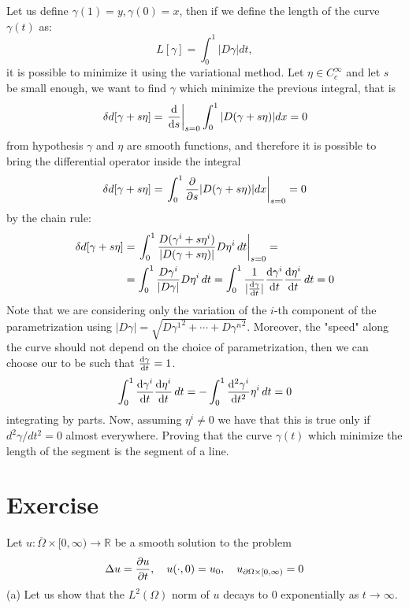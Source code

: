 \documentclass{article}
\newcommand{\R}{\mathbb{R}}
\begin{document}
Let us define $\gamma(1) = y, \gamma(0) = x$, then if we define the length of the curve $\gamma(t)$ as:
\[
    L[\gamma] = \int_0^1 |D \gamma| dt,
\]
it is possible to minimize it using the variational method. Let $\eta \in C_c^\infty$ and let $s$ be small enough, we want to find $\gamma$ which minimize the previous integral, that is 
\[
    \delta d[\gamma + s \eta] = {\left. \odv{}{s}\right|}_{s=0} \int_{0}^{1} |D(\gamma + s \eta)| dx = 0
\]
from hypothesis $\gamma$ and $\eta$ are smooth functions, and therefore it is possible to bring the differential operator inside the integral
\[
    \delta d[\gamma + s \eta] = {\left. \int_{0}^{1}  \pdv{}{s} |D(\gamma + s \eta)| dx \right|}_{s=0} = 0
\]
by the chain rule:
\[
    \begin{split}
        \delta d[\gamma + s \eta] &= {\left. \int_{0}^{1} \frac{D(\gamma^i + s \eta^i)}{|D(\gamma + s \eta)|} D \eta^i \, dt \right|}_{s=0} =\\
        &= \int_{0}^{1} \frac{D\gamma^i}{|D\gamma|} D \eta^i\, dt = \int_{0}^{1} \frac{1}{|\odv{\gamma}{t}|} \odv{\gamma^i}{t} \odv{\eta^i}{t}\, dt = 0
    \end{split}
\]
Note that we are considering only the variation of the $i$-th component of the parametrization using $|D \gamma| = \sqrt{{D\gamma^1}^2 + \cdots + {D\gamma^n}^2}$.  Moreover, the "speed" along the curve should not depend on the choice of parametrization, then we can choose our to be such that $\odv{\gamma}{t} = 1$.
\[
    \int_{0}^{1} \odv{\gamma^i}{t} \odv{\eta^i}{t}\, dt = - \int_{0}^{1} \odv[2]{\gamma^i}{t} \eta^i\, dt = 0
\]
integrating by parts. Now, assuming $\eta^i \neq 0$ we have that this is true only if $d^2 \gamma / dt^2 = 0$ almost everywhere. Proving that the curve $\gamma(t)$ which minimize the length of the segment is the segment of a line.
\section{Exercise}
Let $u : \overline{\Omega} \times [0, \infty) \to \R$ be a smooth solution to the problem
\[
    \Delta u = \pdv{u}{t}, \quad u(\cdot, 0) = u_0, \quad u_{\partial \Omega \times [0, \infty)} = 0
\]
(a) Let us show that the $L^2 (\Omega)$ norm of $u$ decays to $0$ exponentially as $t \to \infty$.
\end{document}
